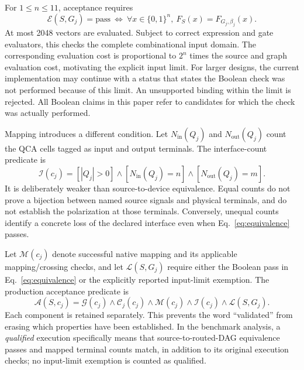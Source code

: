 \documentclass[ASNA,twocolumn]{USG}
\begin{document}
For $1\leq n\leq11$, acceptance requires
\begin{equation}\label{eq:equivalence}
\mathcal E(S,G_j)=\mathrm{pass}
\ \Longleftrightarrow\ 
\forall x\in\{0,1\}^{n},\ F_S(x)=F_{G_j,\beta_j}(x).
\end{equation}
At most 2048 vectors are evaluated. Subject to correct expression and gate evaluators, this checks the complete combinational input domain. The corresponding evaluation cost is proportional to $2^n$ times the source and graph evaluation cost, motivating the explicit input limit. For larger designs, the current implementation may continue with a status that states the Boolean check was not performed because of this limit. An unsupported binding within the limit is rejected. All Boolean claims in this paper refer to candidates for which the check was actually performed.

Mapping introduces a different condition. Let $N_{\mathrm{in}}(Q_j)$ and $N_{\mathrm{out}}(Q_j)$ count the QCA cells tagged as input and output terminals. The interface-count predicate is
\begin{equation}\label{eq:terminals}
\mathcal I(c_j)=[|Q_j|>0]\land[N_{\mathrm{in}}(Q_j)=n]
\land[N_{\mathrm{out}}(Q_j)=m].
\end{equation}
It is deliberately weaker than source-to-device equivalence. Equal counts do not prove a bijection between named source signals and physical terminals, and do not establish the polarization at those terminals. Conversely, unequal counts identify a concrete loss of the declared interface even when Eq.~\eqref{eq:equivalence} passes.

Let $\mathcal M(c_j)$ denote successful native mapping and its applicable mapping/crossing checks, and let $\mathcal L(S,G_j)$ require either the Boolean pass in Eq.~\eqref{eq:equivalence} or the explicitly reported input-limit exemption. The production acceptance predicate is
\begin{equation}\label{eq:accept}
\mathcal A(S,c_j)=\mathcal G(c_j)\land\mathcal C_j(c_j)
\land\mathcal M(c_j)\land\mathcal I(c_j)\land\mathcal L(S,G_j).
\end{equation}
Each component is retained separately. This prevents the word ``validated'' from erasing which properties have been established. In the benchmark analysis, a \emph{qualified} execution specifically means that source-to-routed-DAG equivalence passes and mapped terminal counts match, in addition to its original execution checks; no input-limit exemption is counted as qualified.
\end{document}
